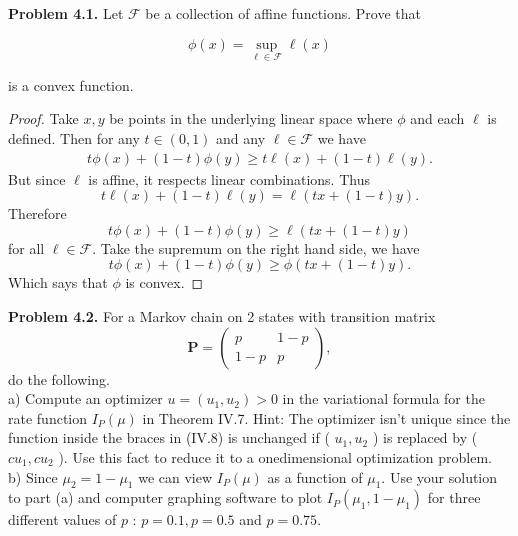 
\textbf{Problem 4.1.} Let $\mathcal{F}$ be a collection of affine functions. Prove that

\[
\phi(x)=\sup _{\ell \in \mathcal{F}} \ell(x)
\]

is a convex function.
\begin{proof}
	Take $x,y$ be points in the underlying linear space where $\phi$ and each $\ell$ is defined. Then for any $t \in (0,1)$ and any $\ell \in \mathcal{F}$ we have
	\begin{align*}
		t \phi(x) + (1 - t) \phi(y) \ge t \ell(x) + (1-t) \ell(y)
	.\end{align*}
	But since $\ell$ is affine, it respects linear combinations. Thus
	\[
		t \ell(x) + (1 - t) \ell(y) = \ell\left(t x + (1-t) y\right)
	.\] 
	Therefore
	\[
		t \phi(x) + (1 - t) \phi(y) \ge \ell\left(t x + (1-t) y\right)
	\] 
	for all $\ell \in \mathcal{F}$. Take the supremum on the right hand side, we have
	\[
		t \phi(x) + (1-t) \phi(y) \ge \phi\left(t x + (1-t) y\right)
	.\] 
	 Which says that $\phi$ is convex.
\end{proof}

\textbf{Problem 4.2.} For a Markov chain on 2 states with transition matrix
\[
\mathbf{P}=\left(\begin{array}{cc}
p & 1-p \\
1-p & p
\end{array}\right),
\]
do the following.\\
a) Compute an optimizer $u=\left(u_1, u_2\right)>0$ in the variational formula for the rate function $I_P(\mu)$ in Theorem IV.7.
Hint: The optimizer isn't unique since the function inside the braces in (IV.8) is unchanged if ( $u_1, u_2$ ) is replaced by ( $c u_1, c u_2$ ). Use this fact to reduce it to a onedimensional optimization problem.\\
b) Since $\mu_2=1-\mu_1$ we can view $I_P(\mu)$ as a function of $\mu_1$. Use your solution to part (a) and computer graphing software to plot $I_P\left(\mu_1, 1-\mu_1\right)$ for three different values of $p$ : $p=0.1, p=0.5$ and $p=0.75$.

